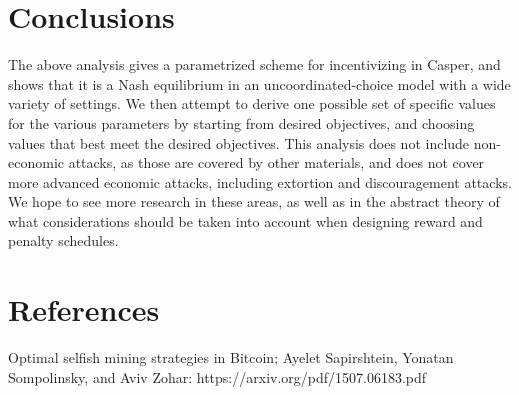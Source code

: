 \documentclass[12pt]{article}
\begin{document}
\section{Conclusions}

The above analysis gives a parametrized scheme for incentivizing in Casper, and shows that it is a Nash equilibrium in an uncoordinated-choice model with a wide variety of settings. We then attempt to derive one possible set of specific values for the various parameters by starting from desired objectives, and choosing values that best meet the desired objectives. This analysis does not include non-economic attacks, as those are covered by other materials, and does not cover more advanced economic attacks, including extortion and discouragement attacks. We hope to see more research in these areas, as well as in the abstract theory of what considerations should be taken into account when designing reward and penalty schedules.

\section{References}


Optimal selfish mining strategies in Bitcoin; Ayelet Sapirshtein, Yonatan Sompolinsky, and Aviv Zohar: https://arxiv.org/pdf/1507.06183.pdf
\end{document}
